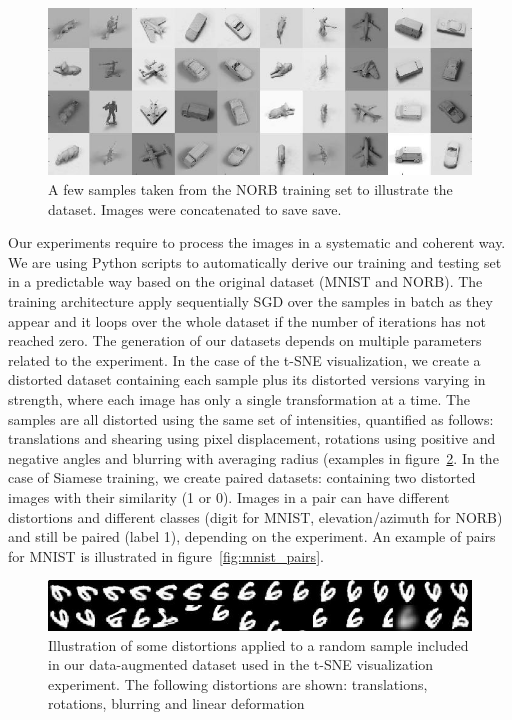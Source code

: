 \documentclass[a4paper,12pt]{report}
\begin{document}
\begin{figure}[t]
    \begin{center}
        \includegraphics{thesis_figures/norb.jpg}
    \end{center}
    \caption{A few samples taken from the NORB training set to illustrate the dataset. Images were concatenated to save save.}
    \label{fig:norb}
\end{figure}

Our experiments require to process the images in a systematic and coherent way.
We are using Python scripts to automatically derive our training and testing set in a predictable way based on the original dataset (MNIST and NORB).
The training architecture apply sequentially SGD over the samples in batch as they appear and it loops over the whole dataset if the number of iterations has not reached zero.
The generation of our datasets depends on multiple parameters related to the experiment.
In the case of the t-SNE visualization, we create a distorted dataset containing each sample plus its distorted versions varying in strength, where each image has only a single transformation at a time.
The samples are all distorted using the same set of intensities, quantified as follows: translations and shearing using pixel displacement, rotations using positive and negative angles and blurring with averaging radius (examples in figure~\ref{fig:mnist_transfo_tsne}.
In the case of Siamese training, we create paired datasets: containing two distorted images with their similarity (1 or 0).
Images in a pair can have different distortions and different classes (digit for MNIST, elevation/azimuth for NORB) and still be paired (label 1), depending on the experiment.
An example of pairs for MNIST is illustrated in figure~\ref{fig:mnist_pairs}.

\begin{figure}[t]
    \begin{center}
        \includegraphics{thesis_figures/mnist_transfo_tsne.jpg}
    \end{center}
    \caption{Illustration of some distortions applied to a random sample included in our data-augmented dataset used in the t-SNE visualization experiment. The following distortions are shown: translations, rotations, blurring and linear deformation}
    \label{fig:mnist_transfo_tsne}
\end{figure}
\end{document}
